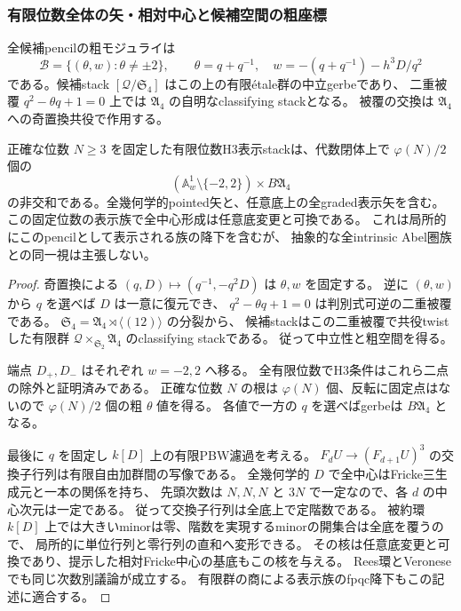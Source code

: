 \subsubsection{有限位数全体の矢・相対中心と候補空間の粗座標}
\begin{proposition}[粗座標と固定位数表示stack]
\label{prop:quantum-triangle-coarse}
全候補pencilの粗モジュライは
\[
 \mathcal B=\{(\theta,w):\theta\ne\pm2\},\qquad
 \theta=q+q^{-1},\quad w=-(q+q^{-1})-h^3D/q^2
\]
である。候補stack $[\mathcal Q/\mathfrak S_4]$ はこの上の有限\'etale群の中立gerbeであり、
二重被覆 $q^2-\theta q+1=0$ 上では $\mathfrak A_4$ の自明なclassifying stackとなる。
被覆の交換は $\mathfrak A_4$ への奇置換共役で作用する。

正確な位数 $N\ge3$ を固定した有限位数H3表示stackは、代数閉体上で
$\varphi(N)/2$ 個の
\[
 (\mathbb A^1_w\setminus\{-2,2\})\times B\mathfrak A_4
\]
の非交和である。全幾何学的pointed矢と、任意底上の全graded表示矢を含む。
この固定位数の表示族で全中心形成は任意底変更と可換である。
これは局所的にこのpencilとして表示される族の降下を含むが、
抽象的な全intrinsic Abel圏族との同一視は主張しない。
\end{proposition}
\begin{proof}
奇置換による $(q,D)\mapsto(q^{-1},-q^2D)$ は $\theta,w$ を固定する。
逆に $(\theta,w)$ から $q$ を選べば $D$ は一意に復元でき、
$q^2-\theta q+1=0$ は判別式可逆の二重被覆である。
$\mathfrak S_4=\mathfrak A_4\rtimes\langle(12)\rangle$ の分裂から、
候補stackはこの二重被覆で共役twistした有限群
$\mathcal Q\times_{\mathfrak S_2}\mathfrak A_4$ のclassifying stackである。
従って中立性と粗空間を得る。

端点 $D_+,D_-$ はそれぞれ $w=-2,2$ へ移る。
全有限位数でH3条件はこれら二点の除外と証明済みである。
正確な位数 $N$ の根は $\varphi(N)$ 個、反転に固定点はないので
$\varphi(N)/2$ 個の粗 $\theta$ 値を得る。
各値で一方の $q$ を選べばgerbeは $B\mathfrak A_4$ となる。

最後に $q$ を固定し $k[D]$ 上の有限PBW濾過を考える。
$F_dU\to(F_{d+1}U)^3$ の交換子行列は有限自由加群間の写像である。
全幾何学的 $D$ で全中心はFricke三生成元と一本の関係を持ち、
先頭次数は $N,N,N$ と $3N$ で一定なので、各 $d$ の中心次元は一定である。
従って交換子行列は全底上で定階数である。
被約環 $k[D]$ 上では大きいminorは零、階数を実現するminorの開集合は全底を覆うので、
局所的に単位行列と零行列の直和へ変形できる。
その核は任意底変更と可換であり、提示した相対Fricke中心の基底もこの核を与える。
Rees環とVeroneseでも同じ次数別議論が成立する。
有限群の商による表示族のfpqc降下もこの記述に適合する。
\end{proof}

